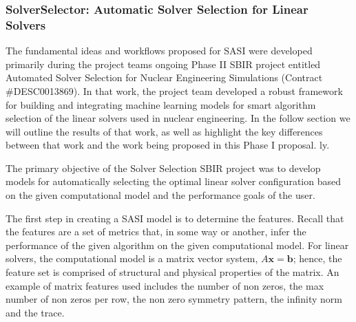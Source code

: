 \subsubsection{SolverSelector: Automatic Solver Selection for Linear Solvers} 
\label{sec:linearsolvers}

The fundamental ideas and workflows proposed for SASI were developed primarily during the project teams ongoing Phase II SBIR project entitled Automated Solver Selection for Nuclear Engineering Simulations (Contract \#DESC0013869). In that work, the project team developed a robust framework for building and integrating machine learning models for smart algorithm selection of the linear solvers used in nuclear engineering. In the follow section we will outline the results of that work, as well as highlight the key differences between that work and the work being proposed in this Phase I proposal.  
ly. 

The primary objective of the Solver Selection SBIR project was to develop models for automatically selecting the optimal linear solver configuration based on the given computational model and the performance goals of the user. 

The first step in creating a SASI model is to determine the features. Recall that the features are a set of metrics that, in some way or another, infer the performance of the given algorithm on the given computational model. For linear solvers, the computational model is a matrix vector system, $A\mathbf{x} = \mathbf{b}$; hence, the feature set is comprised of structural and physical properties of the matrix. An example of matrix features used includes the number of non zeros, the max number of non zeros per row, the non zero symmetry pattern, the infinity norm and the trace.  

%

